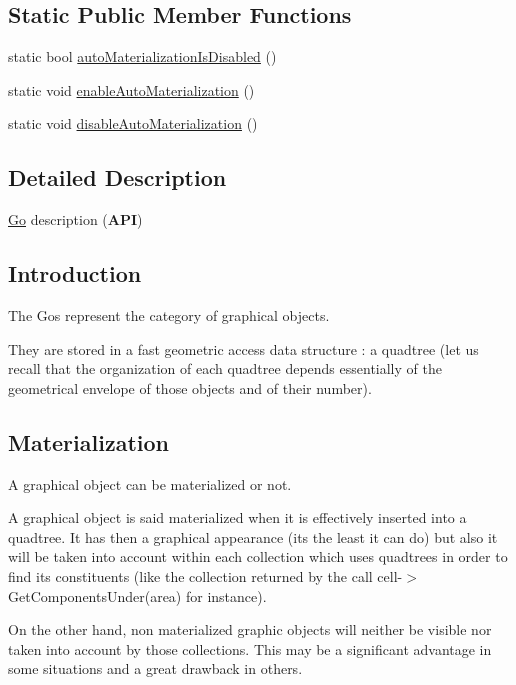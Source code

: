 \subsection*{Static Public Member Functions}
\begin{DoxyCompactItemize}
\item 
static bool \mbox{\hyperlink{classHurricane_1_1Go_a1057be4198a7b64c32a2ac3c7d560014}{auto\+Materialization\+Is\+Disabled}} ()
\item 
static void \mbox{\hyperlink{classHurricane_1_1Go_ab0b1ca3c606247e1ebd7cab8fa828b04}{enable\+Auto\+Materialization}} ()
\item 
static void \mbox{\hyperlink{classHurricane_1_1Go_a0d49d22a3788e8001e58152e62b9f3cc}{disable\+Auto\+Materialization}} ()
\end{DoxyCompactItemize}


\subsection{Detailed Description}
\mbox{\hyperlink{classHurricane_1_1Go}{Go}} description ({\bfseries A\+PI}) 

\hypertarget{classHurricane_1_1Go_secGoIntro}{}\subsection{Introduction}\label{classHurricane_1_1Go_secGoIntro}
The Gos represent the category of graphical objects.

They are stored in a fast geometric access data structure \+: a quadtree (let us recall that the organization of each quadtree depends essentially of the geometrical envelope of those objects and of their number).\hypertarget{classHurricane_1_1Go_secGoMaterialization}{}\subsection{Materialization}\label{classHurricane_1_1Go_secGoMaterialization}
A graphical object can be materialized or not.

A graphical object is said materialized when it is effectively inserted into a quadtree. It has then a graphical appearance (it\textquotesingle{}s the least it can do) but also it will be taken into account within each collection which uses quadtrees in order to find its constituents (like the collection returned by the call cell-\/$>$Get\+Components\+Under(area) for instance).

On the other hand, non materialized graphic objects will neither be visible nor taken into account by those collections. This may be a significant advantage in some situations and a great drawback in others.

